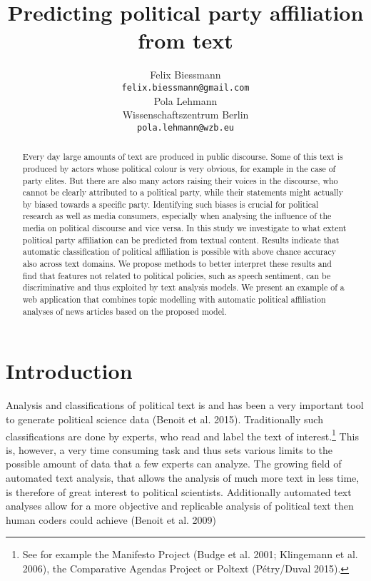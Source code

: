 \documentclass[11pt]{article}
\title{Predicting political party affiliation from text}
\author{Felix Biessmann\\
  {\tt felix.biessmann@gmail.com} \\\And
 Pola Lehmann \\
  Wissenschaftszentrum Berlin \\
  {\tt pola.lehmann@wzb.eu} \\}
\date{}
\begin{document}
\maketitle


\begin{abstract}
Every day large amounts of text are produced in public discourse. Some of this text is produced by actors whose political colour is very obvious, for example in the case of party elites. But there are also many actors raising their voices in the discourse, who cannot be clearly attributed to a political party, while their statements might actually by biased towards a specific party. Identifying such biases is crucial for political research as well as media consumers, especially when analysing the influence of the media on political discourse and vice versa. In this study we investigate to what extent political party affiliation can be predicted from textual content. Results indicate that automatic classification of political affiliation is possible with above chance accuracy also across text domains. We propose methods to better interpret these results and find that features not related to political policies, such as speech sentiment, can be discriminative and thus exploited by text analysis models. We present an example of a web application that combines topic modelling with automatic political affiliation analyses of news articles based on the proposed model.
\end{abstract}

\section{Introduction}
\label{sec:intro}
%
Analysis and classifications of political text is and has been a very important tool to generate political science data (Benoit et al. 2015). Traditionally such classifications are done by experts, who read and label the text of interest.\footnote{See for example the Manifesto Project (Budge et al. 2001; Klingemann et al. 2006), the Comparative Agendas Project or Poltext (Pétry/Duval 2015).} This is, however, a very time consuming task and thus sets various limits to the possible amount of data that a few experts can analyze. The growing field of automated text analysis, that allows the analysis of much more text in less time, is therefore of great interest to political scientists. Additionally automated text analyses allow for a more objective and replicable analysis of political text then human coders could achieve (Benoit et al. 2009)
\end{document}
